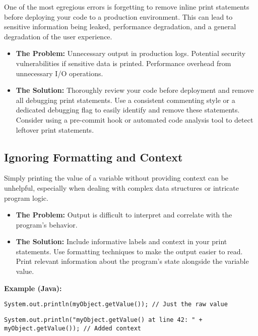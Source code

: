 \documentclass{article}
\begin{document}
{{{{One of the most egregious errors is forgetting to remove inline print statements before deploying your code to a production environment. This can lead to sensitive information being leaked, performance degradation, and a general degradation of the user experience.

\begin{itemize}
    \item {\bf The Problem:} Unnecessary output in production logs. Potential security vulnerabilities if sensitive data is printed. Performance overhead from unnecessary I/O operations.
    \item {\bf The Solution:} Thoroughly review your code before deployment and remove all debugging print statements. Use a consistent commenting style or a dedicated debugging flag to easily identify and remove these statements. Consider using a pre-commit hook or automated code analysis tool to detect leftover print statements.
\end{itemize}

\subsection*{Ignoring Formatting and Context}

Simply printing the value of a variable without providing context can be unhelpful, especially when dealing with complex data structures or intricate program logic.

\begin{itemize}
    \item {\bf The Problem:} Output is difficult to interpret and correlate with the program's behavior.
    \item {\bf The Solution:}  Include informative labels and context in your print statements. Use formatting techniques to make the output easier to read.  Print relevant information about the program's state alongside the variable value.
\end{itemize}

{\bf Example (Java):}

\begin{verbatim}
System.out.println(myObject.getValue()); // Just the raw value
\end{verbatim}

\begin{verbatim}
System.out.println("myObject.getValue() at line 42: " + myObject.getValue()); // Added context
\end{verbatim}

}}}}
\end{document}
